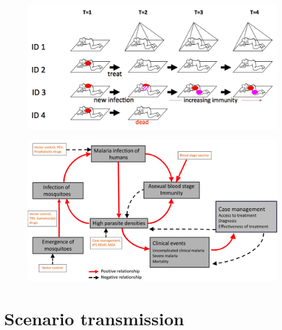\documentclass[]{scrartcl}
\begin{document}
\begin{figure}
\includegraphics[width=\textwidth]{images/malariatreatment.png}
\end{figure}

\begin{figure}
\includegraphics[width=\textwidth]{images/accesstotreatment.png}
\end{figure}
\section{Scenario transmission}
\end{document}
